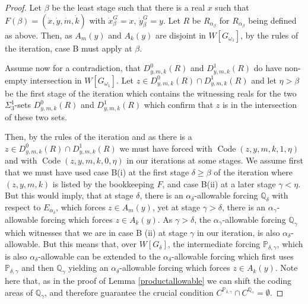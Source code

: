 \documentclass[a4paper,11pt]{article}
\newcommand{\forceP}{\mathbb{P}}
\newcommand{\forceQ}{\mathbb{Q}}
\begin{document}
\begin{proof}
Let $\beta$ be the least stage such that there is a real $x$ such that $F(\beta) =(\dot{x}, \dot{y},\dot{m},\dot{k})$ with $\dot{x}^G_{\beta}=x$, $\dot{y}^G_{\beta}=y$. Let $R$ be $R_{\alpha_{\beta}}$ for $R_{\alpha_{\beta}}$ being defined as above. Then, as $A_m(y)$ and $A_k(y)$ are disjoint in $W[G_{\omega_1}]$, by the rules of the iteration, case B must apply at $\beta$. 

Assume now for a contradiction, that $D^0_{y,m,k}(R)$ and $ D^1_{y,m,k}(R)$ do have non-empty intersection in $W[G_{\omega_1}]$. Let $z \in D^0_{y,m,k}(R) \cap D^1_{y,m,k}(R)$ and let $\eta > \beta$ be the first stage of the iteration which contains the witnessing reals for the two $\Sigma^1_3$-sets $D^0_{y,m,k}(R)$ and $D^1_{y,m,k}(R)$ which confirm that $z$ is in the intersection of these two sets.  


Then, by the rules of the iteration and as there is a $z \in D^0_{y,m,k}(R) \cap D^1_{y,m,k}(R)$ we must have forced with $\operatorname{Code} (z,y,m,k,1,\eta)$ and with $\operatorname{Code} (z,y,m,k,0,\eta)$ in our iterations at some stages. We assume first that we must have used case B(i) at the first stage  $\delta \ge \beta$ of the iteration where $(z,y,m,k)$ is listed by the bookkeeping $F$, and case B(ii) at  a later stage $\gamma < \eta$. But this would imply, that at stage $\delta$, there is an $\alpha_{\delta}$-allowable forcing  $\forceQ_{\delta}$ with respect to $E_{\alpha_{\delta}}$, which forces $z \in A_m(y)$, yet at stage $\gamma > \delta$, there is an $\alpha_{\gamma}$-allowable forcing which forces $z \in A_k(y)$.
As $\gamma> \delta$, the $\alpha_{\gamma}$-allowable forcing $\forceQ_{\gamma}$ which witnesses that we are in case B (ii) at stage $\gamma$ in our iteration, is also $\alpha_{\delta}$-allowable. But this means that, over $W[G_{\delta}]$, the intermediate forcing $\forceP_{\delta,\gamma}$, which is also $\alpha_{\delta}$-allowable can be extended to the $\alpha_{\delta}$-allowable forcing which first uses $\forceP_{\delta,\gamma}$ and then $\forceQ_{\gamma}$  yielding an $\alpha_{\delta}$-allowable forcing which forces $z \in A_k(y)$. Note here that, as in the proof of Lemma \ref{productallowable} we can shift the coding areas of $\forceQ_{\gamma}$, and therefore guarantee the crucial condition $C^{\forceP_{\delta,\gamma}} \cap C^{\forceQ_{\gamma}}= \emptyset.$


\end{proof}
\end{document}
